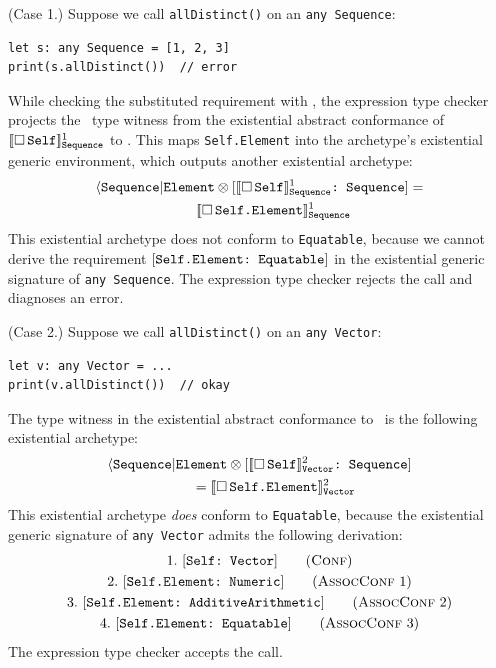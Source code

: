 \documentclass[../generics]{subfiles}
\begin{document}
\begin{example}
(Case 1.) Suppose we call \texttt{allDistinct()} on an \texttt{any~Sequence}:
\begin{Verbatim}
let s: any Sequence = [1, 2, 3]
print(s.allDistinct())  // error
\end{Verbatim}
While checking the substituted requirement with , the expression type checker projects the \nElement\ type witness from the existential abstract conformance of $[\![\Box\,\texttt{Self}]\!]^1_{\texttt{Sequence}}$ to \tSequence. This maps \texttt{Self.Element} into the archetype's existential generic environment, which outputs another existential archetype:
\begin{gather*}
\langle\texttt{Sequence}|\texttt{Element} \otimes [\texttt{$[\![\Box\,\texttt{Self}]\!]^1_{\texttt{Sequence}}$:~Sequence}] = \\
\qquad [\![\Box\,\texttt{Self.Element}]\!]^1_{\texttt{Sequence}}
\end{gather*}
This existential archetype does not conform to \texttt{Equatable}, because we cannot derive the requirement $[\texttt{Self.Element:~Equatable}]$ in the existential generic signature of \texttt{any~Sequence}. The expression type checker rejects the call and diagnoses an error.

\smallskip

(Case 2.) Suppose we call \texttt{allDistinct()} on an \texttt{any~Vector}:
\begin{Verbatim}
let v: any Vector = ...
print(v.allDistinct())  // okay
\end{Verbatim}
The type witness in the existential abstract conformance to \tSequence\ is the following existential archetype:
\begin{gather*}
\langle\texttt{Sequence}|\texttt{Element} \otimes [\texttt{$[\![\Box\,\texttt{Self}]\!]^2_\texttt{Vector}$:~Sequence}] \\
\qquad {} = [\![\Box\,\texttt{Self.Element}]\!]^2_\texttt{Vector}
\end{gather*}
This existential archetype \emph{does} conform to \texttt{Equatable}, because the existential generic signature of \texttt{any~Vector} admits the following derivation:
\begin{gather*}
\ConfStep{Self}{Vector}{1} \\
\AssocConfStep{1}{Self.Element}{Numeric}{2} \\
\AssocConfStep{2}{Self.Element}{AdditiveArithmetic}{3} \\
\AssocConfStep{3}{Self.Element}{Equatable}{4}
\end{gather*}
The expression type checker accepts the call.


\end{example}
\end{document}
